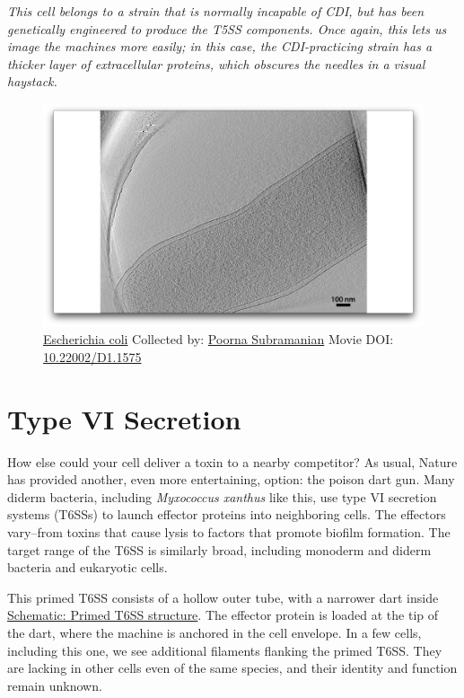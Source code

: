 \documentclass[]{tufte-book}
\begin{document}
\emph{This cell belongs to a strain that is normally incapable of CDI,
but has been genetically engineered to produce the T5SS components. Once
again, this lets us image the machines more easily; in this case, the
CDI-practicing strain has a thicker layer of extracellular proteins,
which obscures the needles in a visual haystack.}





\begin{figure}
\includegraphics{movie_stills/9_5} \caption[\protect\hyperlink{tree}{Escherichia coli} Collected by:
\protect\hyperlink{poorna_subramanian}{Poorna Subramanian} Movie DOI:
\href{https://doi.org/10.22002/D1.1575}{10.22002/D1.1575}]{\protect\hyperlink{tree}{Escherichia coli} Collected by:
\protect\hyperlink{poorna_subramanian}{Poorna Subramanian} Movie DOI:
\href{https://doi.org/10.22002/D1.1575}{10.22002/D1.1575}}\label{fig:9-5}
\end{figure}

\section{Type VI Secretion}\label{type-vi-secretion}

How else could your cell deliver a toxin to a nearby competitor? As
usual, Nature has provided another, even more entertaining, option: the
poison dart gun. Many diderm bacteria, including \emph{Myxococcus
xanthus} like this, use type VI secretion systems (T6SSs) to launch
effector proteins into neighboring cells. The effectors vary--from
toxins that cause lysis to factors that promote biofilm formation. The
target range of the T6SS is similarly broad, including monoderm and
diderm bacteria and eukaryotic cells.

This primed T6SS consists of a hollow outer tube, with a narrower dart
inside \protect\hyperlink{Primed_T6SS_structure}{Schematic: Primed T6SS
structure}. The effector protein is loaded at the tip of the dart, where
the machine is anchored in the cell envelope. In a few cells, including
this one, we see additional filaments flanking the primed T6SS. They are
lacking in other cells even of the same species, and their identity and
function remain unknown.
\end{document}
